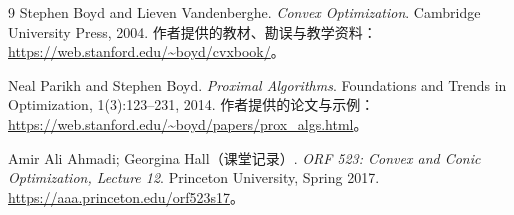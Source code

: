 \documentclass[UTF8,12pt,a4paper,fontset=fandol]{ctexbook}
\begin{document}
\begin{thebibliography}{9}
Stephen Boyd and Lieven Vandenberghe.
\emph{Convex Optimization}. Cambridge University Press, 2004.
作者提供的教材、勘误与教学资料：\url{https://web.stanford.edu/~boyd/cvxbook/}。

Neal Parikh and Stephen Boyd.
\emph{Proximal Algorithms}.
Foundations and Trends in Optimization, 1(3):123--231, 2014.
作者提供的论文与示例：\url{https://web.stanford.edu/~boyd/papers/prox_algs.html}。


Amir Ali Ahmadi; Georgina Hall（课堂记录）.
\emph{ORF 523: Convex and Conic Optimization, Lecture 12}.
Princeton University, Spring 2017.
\url{https://aaa.princeton.edu/orf523s17}。
\end{thebibliography}
\end{document}
